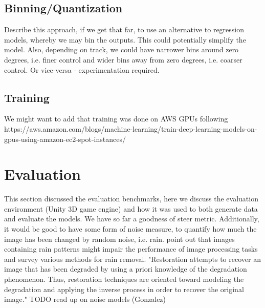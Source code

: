\subsection{Binning/Quantization}
Describe this approach, if we get that far, to use an alternative to regression models, whereby we may bin the outputs. This could potentially simplify the model. Also, depending on track, we could have narrower bins around zero degrees, i.e. finer control and wider bins away from zero degrees, i.e. coarser control. Or vice-versa - experimentation required.

\subsection{Training}

We might want to add that training was done on AWS GPUs following   
https://aws.amazon.com/blogs/machine-learning/train-deep-learning-models-on-gpus-using-amazon-ec2-spot-instances/  


\section{Evaluation}
This section discussed the evaluation benchmarks, here we discuss the evaluation environment (Unity 3D game engine) and how it was used to both generate data and evaluate the models.
We have so far a goodness of steer metric. Additionally, it would be good to have some form of noise measure, to quantify how much the image has been changed by random noise, i.e. rain.
\cite{wang2019survey} point out that images containing rain patterns  might  impair  the  performance of image processing tasks and survey various methods for rain removal.  
\cite{gonzalez2018} "Restoration attempts to recover an image that has been degraded by using a priori knowledge of the degradation phenomenon. Thus, restoration techniques are oriented toward modeling the degradation and applying the inverse process in order to recover the original image."
TODO read up on noise models (Gonzalez)



